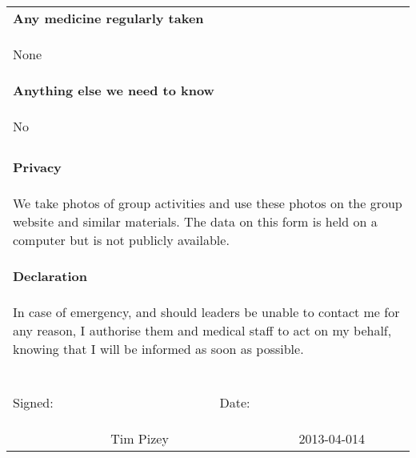 \documentclass [12pt, a4paper] {article}
\begin{document}
\begin{table}
\begin{tabular}{|p{2.5cm}p{5cm}|p{2.5cm}p{5cm}|}
\multicolumn{4}{|p{15cm}|}{\textbf{Any medicine regularly taken}}\\
\multicolumn{4}{|p{15cm}|}{
\begin{singlespace}
None
\end{singlespace}
}\\


\multicolumn{4}{|p{15cm}|}{\textbf{Anything else we need to know}}\\
\multicolumn{4}{|p{15cm}|}{
\begin{singlespace}
No 
\end{singlespace}
}\\


\hline
\multicolumn{4}{p{15cm}}{ }\\
\hline

\multicolumn{4}{|p{15cm}|}{\textbf{Privacy}}\\
\multicolumn{4}{|p{15cm}|}{
\begin{singlespace}
We take photos of group activities and use these photos on the group website and similar materials. 
The data on this form is held on a computer but is not publicly available.
\end{singlespace}
}\\
\hline
\multicolumn{4}{|p{15cm}|}{\textbf{Declaration}}\\
\multicolumn{4}{|p{15cm}|}{
\begin{singlespace}
In case of emergency, and should leaders be unable to contact me for any reason, 
I authorise them and medical staff to act on my behalf, 
knowing that I will be informed as soon as possible.
\end{singlespace}
}\\


\hline
\multicolumn{4}{p{15cm}}{ }\\
\hline

\begin{doublespace}
Signed:  
\end{doublespace}
&                 &  Date:  &  
\\
              & Tim Pizey &            & 2013-04-014 \\
\hline
\end{tabular}
\label{tab:methodTypes}
\end{table}
\end{document}
